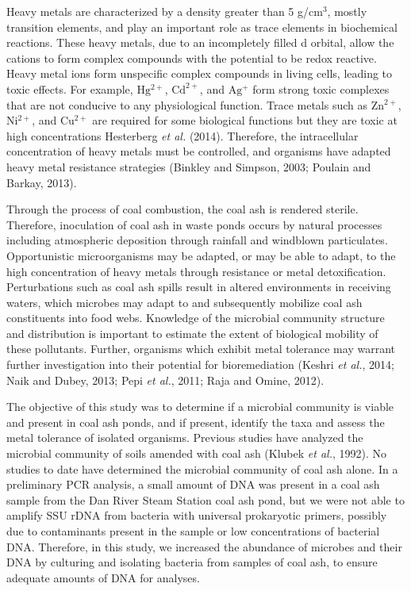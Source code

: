\documentclass[ms, hidelinks]{uncgdissertationexp}
\theoremstyle{plain}
\theoremstyle{definition}
\theoremstyle{remark}
\begin{document}
Heavy metals are characterized by a density greater than 5 g/\(\mathrm{cm^3}\), mostly transition elements, and play an important role as trace elements in biochemical reactions. These heavy metals, due to an incompletely filled d orbital, allow the cations to form complex compounds with the potential to be redox reactive. Heavy metal ions form unspecific complex compounds in living cells, leading to toxic effects. For example, \(\mathrm{Hg^{2+}}\), \(\mathrm{Cd^{2+}}\), and \(\mathrm{Ag^{+}}\) form strong toxic complexes that are not conducive to any physiological function. Trace metals such as \(\mathrm{Zn^{2+}}\), \(\mathrm{Ni^{2+}}\), and \(\mathrm{Cu^{2+}}\) are required for some biological functions but they are toxic at high concentrations Hesterberg \emph{et al.} (2014). Therefore, the intracellular concentration of heavy metals must be controlled, and organisms have adapted heavy metal resistance strategies (Binkley and Simpson, 2003; Poulain and Barkay, 2013).

Through the process of coal combustion, the coal ash is rendered sterile. Therefore, inoculation of coal ash in waste ponds occurs by natural processes including atmospheric deposition through rainfall and windblown particulates. Opportunistic microorganisms may be adapted, or may be able to adapt, to the high concentration of heavy metals through resistance or metal detoxification. Perturbations such as coal ash spills result in altered environments in receiving waters, which microbes may adapt to and subsequently mobilize coal ash constituents into food webs. Knowledge of the microbial community structure and distribution is important to estimate the extent of biological mobility of these pollutants. Further, organisms which exhibit metal tolerance may warrant further investigation into their potential for bioremediation (Keshri \emph{et al.}, 2014; Naik and Dubey, 2013; Pepi \emph{et al.}, 2011; Raja and Omine, 2012).

The objective of this study was to determine if a microbial community is viable and present in coal ash ponds, and if present, identify the taxa and assess the metal tolerance of isolated organisms. Previous studies have analyzed the microbial community of soils amended with coal ash (Klubek \emph{et al.}, 1992). No studies to date have determined the microbial community of coal ash alone. In a preliminary PCR analysis, a small amount of DNA was present in a coal ash sample from the Dan River Steam Station coal ash pond, but we were not able to amplify SSU rDNA from bacteria with universal prokaryotic primers, possibly due to contaminants present in the sample or low concentrations of bacterial DNA. Therefore, in this study, we increased the abundance of microbes and their DNA by culturing and isolating bacteria from samples of coal ash, to ensure adequate amounts of DNA for analyses.
\end{document}
